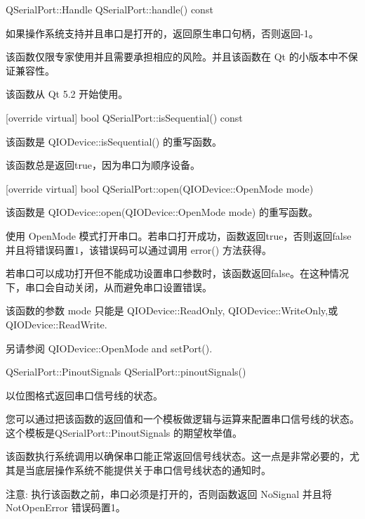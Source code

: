 QSerialPort::Handle QSerialPort::handle() const

如果操作系统支持并且串口是打开的，返回原生串口句柄，否则返回-1。

\begin{warning}
该函数仅限专家使用并且需要承担相应的风险。并且该函数在 Qt 的小版本中不保证兼容性。
\end{warning}

该函数从 Qt 5.2 开始使用。

[override virtual] bool QSerialPort::isSequential() const

该函数是 QIODevice::isSequential() 的重写函数。

该函数总是返回true，因为串口为顺序设备。

[override virtual] bool QSerialPort::open(QIODevice::OpenMode mode)

该函数是 QIODevice::open(QIODevice::OpenMode mode) 的重写函数。

使用 OpenMode 模式打开串口。若串口打开成功，函数返回true，否则返回false并且将错误码置1，该错误码可以通过调用 error() 方法获得。

\begin{notice}
若串口可以成功打开但不能成功设置串口参数时，该函数返回false。在这种情况下，串口会自动关闭，从而避免串口设置错误。
\end{notice}

\begin{warning}
该函数的参数 mode 只能是 QIODevice::ReadOnly, QIODevice::WriteOnly,或 QIODevice::ReadWrite.
\end{warning}

\begin{seeAlso}
另请参阅 QIODevice::OpenMode and setPort().
\end{seeAlso}

QSerialPort::PinoutSignals QSerialPort::pinoutSignals()

以位图格式返回串口信号线的状态。

您可以通过把该函数的返回值和一个模板做逻辑与运算来配置串口信号线的状态。这个模板是QSerialPort::PinoutSignals 的期望枚举值。

\begin{notice}
该函数执行系统调用以确保串口能正常返回信号线状态。这一点是非常必要的，尤其是当底层操作系统不能提供关于串口信号线状态的通知时。
\end{notice}

\begin{notice}
注意: 执行该函数之前，串口必须是打开的，否则函数返回 NoSignal 并且将 NotOpenError 错误码置1。
\end{notice}

